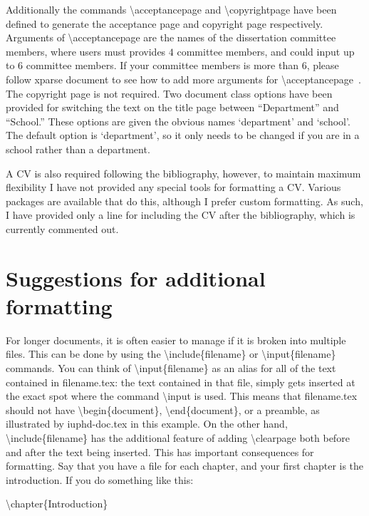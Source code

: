 Additionally the commands \textbackslash acceptancepage and \textbackslash copyrightpage have been defined to generate the acceptance page and copyright page
respectively.  Arguments of \textbackslash acceptancepage are the names of the dissertation committee members, where users must provides $4$ committee members, and could input up to $6$ committee members. If your  committee members is more than $6$, please follow xparse document to see how to add more arguments for \textbackslash acceptancepage~\cite{xparse}.
The copyright page is not required.  Two document class options have been provided
for switching the text on the title page between ``Department'' and ``School.''  These options are given the obvious names `department' and `school'. The
default option is `department', so it only needs to be changed if you are in a school rather than a department.

A CV is also required following the bibliography, however, to maintain maximum flexibility I have not provided any special tools for
formatting a CV.  Various packages are available that do this, although I prefer custom formatting. As such, I have provided only a
line for including the CV after the bibliography, which is currently commented out.



\section{Suggestions for additional formatting}

For longer documents, it is often easier to manage if it is broken into multiple files.  This can be done by using the
\textbackslash include\{filename\} or \textbackslash input\{filename\} commands.  You can think of
\textbackslash input\{filename\} as an alias for all of the text contained in filename.tex: the text contained in that file,
simply gets inserted at the exact spot where the command \textbackslash input is used.  This means that filename.tex should not have
\textbackslash begin\{document\}, \textbackslash end\{document\}, or a preamble, as illustrated by iuphd-doc.tex in this example.
On the other hand, \textbackslash include\{filename\} has the additional feature of adding \textbackslash clearpage both before and after
the text being inserted.  This has important consequences for formatting.  Say that you have a file for each chapter,
and your first chapter is the introduction.  If you do something like this:
\medskip

\textbackslash chapter\{Introduction\}

